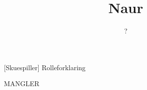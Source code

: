 \documentclass[a4paper,11pt]{article}
\title{Naur}
\author{?}
\begin{document}
\maketitle

\begin{roles}
[Skuespiller] Rolleforklaring
\end{roles}

\begin{sketch}
MANGLER
\end{sketch}
\end{document}
